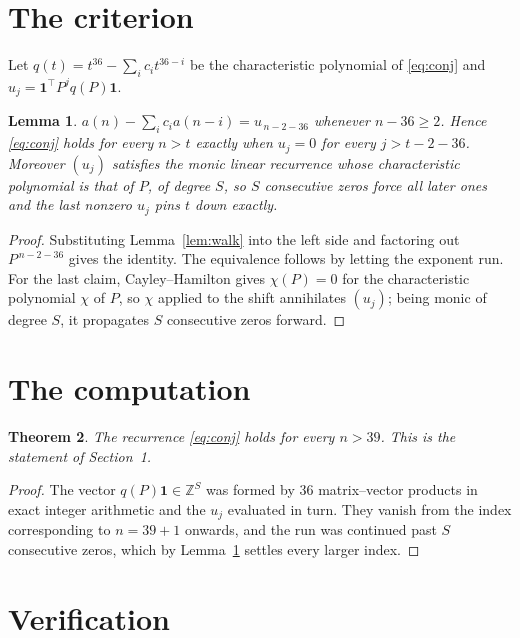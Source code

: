 \documentclass[11pt,a4paper]{article}
\theoremstyle{plain}
\newtheorem{theorem}{Theorem}
\newtheorem{lemma}[theorem]{Lemma}
\theoremstyle{definition}
\begin{document}
\section{The criterion}

Let $q(t)=t^{36}-\sum_i c_i t^{36-i}$ be the characteristic polynomial of
\eqref{eq:conj} and $u_j=\mathbf{1}^{\!\top}P^{j}q(P)\mathbf{1}$.

\begin{lemma}\label{lem:crit}
$a(n)-\sum_i c_i a(n-i)=u_{\,n-2-36}$ whenever $n-36\ge2$. Hence
\eqref{eq:conj} holds for every $n>t$ exactly when $u_j=0$ for every
$j>t-2-36$. Moreover $(u_j)$ satisfies the monic linear recurrence whose
characteristic polynomial is that of $P$, of degree $S$, so $S$ consecutive zeros force all
later ones and the last nonzero $u_j$ pins $t$ down exactly.
\end{lemma}

\begin{proof}
Substituting Lemma~\ref{lem:walk} into the left side and factoring out
$P^{\,n-2-36}$ gives the identity. The equivalence follows by letting the exponent
run. For the last claim, Cayley--Hamilton gives $\chi(P)=0$ for the characteristic
polynomial $\chi$ of $P$, so $\chi$ applied to the shift annihilates $(u_j)$; being monic of
degree $S$, it propagates $S$ consecutive zeros forward.
\end{proof}

\section{The computation}

\begin{theorem}
The recurrence \eqref{eq:conj} holds for every $n>39$. This is the statement of
Section~1.
\end{theorem}

\begin{proof}
The vector $q(P)\mathbf{1}\in\mathbb{Z}^{S}$ was formed by $36$ matrix--vector
products in exact integer arithmetic and the $u_j$ evaluated in turn. They vanish from the
index corresponding to $n=39+1$ onwards, and the run was continued past $S$ consecutive
zeros, which by Lemma~\ref{lem:crit} settles every larger index.
\end{proof}

\section{Verification}
\end{document}
